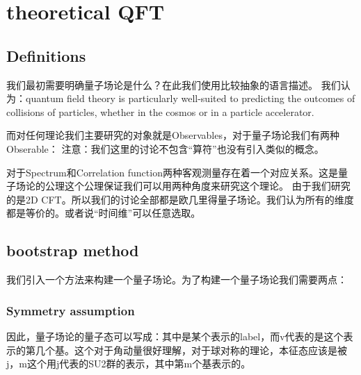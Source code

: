 

\section{theoretical QFT}
\subsection{Definitions}
我们最初需要明确量子场论是什么？在此我们使用比较抽象的语言描述。
我们认为：quantum field theory is particularly well-suited to predicting the outcomes of collisions of particles, whether in the cosmos or in a particle accelerator.

而对任何理论我们主要研究的对象就是Observables，对于量子场论我们有两种Obserable：
注意：我们这里的讨论不包含“算符”也没有引入类似的概念。

对于Spectrum和Correlation function两种客观测量存在着一个对应关系。这是量子场论的公理这个公理保证我们可以用两种角度来研究这个理论。
由于我们研究的是2D CFT。所以我们的讨论全部都是欧几里得量子场论。我们认为所有的维度都是等价的。或者说“时间维”可以任意选取。

\subsection{bootstrap method}

我们引入一个方法来构建一个量子场论。为了构建一个量子场论我们需要两点：

\subsubsection{Symmetry assumption}
因此，量子场论的量子态可以写成：其中\seq{\mR}是某个表示的label，而v代表的是这个表示的第几个基。这个对于角动量很好理解，对于球对称的理论，本征态应该是被j，m这个用j代表的SU2群的表示，其中第m个基表示的。

